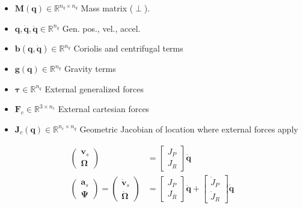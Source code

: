 \documentclass[a4paper, 8pt]{extarticle}
\begin{document}
\begin{multicols*}{3}
\begin{itemize}
\item $\mathbf{M(q)} \in \mathbb{R}^{n_q\times n_q}$ Mass matrix ($\perp$).
\item $\mathbf{q,\dot q,\ddot q} \in \mathbb{R}^{n_q}$ Gen. pos., vel., accel.
\item $\mathbf{b(q,\dot q)} \in \mathbb{R}^{n_q}$ Coriolis and centrifugal terms
\item $\mathbf{g(q)} \in \mathbb{R}^{n_q}$ Gravity terms
\item $\bm\tau \in \mathbb{R}^{n_q}$ External generalized forces
\item $\mathbf{F}_c \in \mathbb{R}^{3\times n_c}$ External cartesian forces
\item $\mathbf J_c(\mathbf q) \in \mathbb R^{n_c\times n_q}$ Geometric Jacobian of location where external forces apply
\end{itemize}
\begin{align*}
\begin{pmatrix} \mathbf v_s \\ \bm{\Omega} \end{pmatrix} &= 
\begin{bmatrix} J_P \\ J_R \end{bmatrix} \dot{\mathbf q} \\
\begin{pmatrix} \mathbf a_s \\ \bm{\Psi} \end{pmatrix} = 
\begin{pmatrix} \dot{\mathbf v}_s \\ \dot{\bm{\Omega}} \end{pmatrix} &= 
\begin{bmatrix} J_P \\ J_R \end{bmatrix} \ddot{\mathbf q} + \begin{bmatrix} \dot J_P \\ \dot J_R \end{bmatrix} \dot{\mathbf q}
\end{align*}





\end{multicols*}
\end{document}

